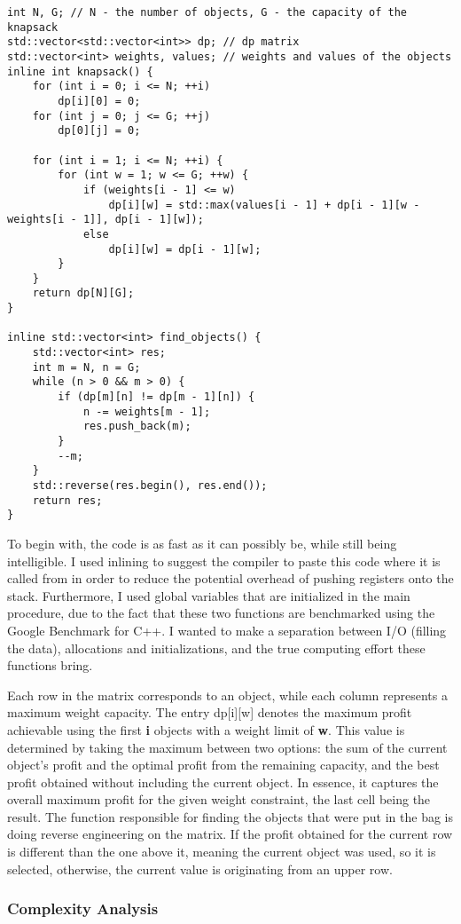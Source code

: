 \documentclass[runningheads]{llncs}
\begin{document}
\begin{lstlisting}
int N, G; // N - the number of objects, G - the capacity of the knapsack
std::vector<std::vector<int>> dp; // dp matrix
std::vector<int> weights, values; // weights and values of the objects
inline int knapsack() {
	for (int i = 0; i <= N; ++i)
		dp[i][0] = 0;
	for (int j = 0; j <= G; ++j)
		dp[0][j] = 0;

	for (int i = 1; i <= N; ++i) {
		for (int w = 1; w <= G; ++w) {
			if (weights[i - 1] <= w)
				dp[i][w] = std::max(values[i - 1] + dp[i - 1][w - weights[i - 1]], dp[i - 1][w]);
			else
				dp[i][w] = dp[i - 1][w];
		}
	}
	return dp[N][G];
}

inline std::vector<int> find_objects() {
	std::vector<int> res;
	int m = N, n = G;
	while (n > 0 && m > 0) {
		if (dp[m][n] != dp[m - 1][n]) {
			n -= weights[m - 1];
			res.push_back(m);
		}
		--m;
	}
	std::reverse(res.begin(), res.end());
	return res;
}
\end{lstlisting}
To begin with, the code is as fast as it can possibly be, while still being intelligible. I used inlining
to suggest the compiler to paste this code where it is called from in order to reduce the potential overhead
of pushing registers onto the stack. Furthermore, I used global variables that are initialized in the main
procedure, due to the fact that these two functions are benchmarked using the Google Benchmark for C++. I
wanted to make a separation between I/O (filling the data), allocations and initializations, and the true
computing effort these functions bring.

Each row in the matrix corresponds to an object, while each column represents a maximum weight capacity.
The entry dp[i][w] denotes the maximum profit achievable using the first \textbf{i} objects with a weight
limit of \textbf{w}. This value is determined by taking the maximum between two options: the sum of the
current object's profit and the optimal profit from the remaining capacity, and the best profit obtained
without including the current object. In essence, it captures the overall maximum profit for the given weight
constraint, the last cell being the result. The function responsible for finding the objects that were put
in the bag is doing reverse engineering on the matrix. If the profit obtained for the current row is different
than the one above it, meaning the current object was used, so it is selected, otherwise, the current value
is originating from an upper row.


\subsubsection{Complexity Analysis}
\end{document}
